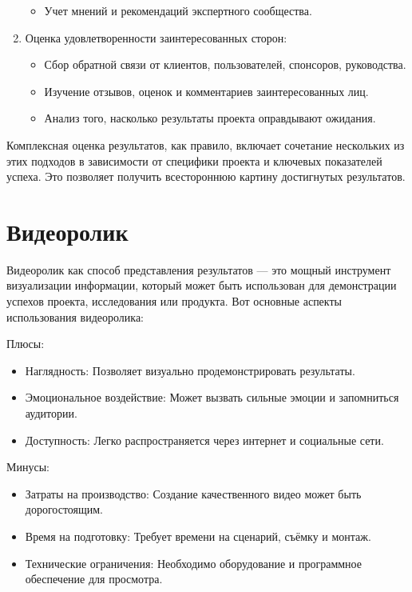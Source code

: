 \begin{enumerate}
\begin{itemize}
                \item Учет мнений и рекомендаций экспертного сообщества.
            \end{itemize}
        \item Оценка удовлетворенности заинтересованных сторон:
            \begin{itemize}
                \item Сбор обратной связи от клиентов, пользователей, спонсоров, руководства.
                \item Изучение отзывов, оценок и комментариев заинтересованных лиц.
                \item Анализ того, насколько результаты проекта оправдывают ожидания.
            \end{itemize}
    \end{enumerate}

    Комплексная оценка результатов, как правило, включает сочетание нескольких из этих подходов в зависимости от специфики проекта и ключевых показателей успеха. Это позволяет получить всестороннюю картину достигнутых результатов.

    \section{Видеоролик}
    Видеоролик как способ представления результатов — это мощный инструмент визуализации информации, который может быть использован для демонстрации успехов проекта, исследования или продукта. Вот основные аспекты использования видеоролика:
    
    Плюсы:
    \begin{itemize}
        \item Наглядность: Позволяет визуально продемонстрировать результаты.
        \item Эмоциональное воздействие: Может вызвать сильные эмоции и запомниться аудитории.
        \item Доступность: Легко распространяется через интернет и социальные сети.
    \end{itemize}
     
    Минусы:
    \begin{itemize}
        \item Затраты на производство: Создание качественного видео может быть дорогостоящим.
        \item Время на подготовку: Требует времени на сценарий, съёмку и монтаж.
        \item Технические ограничения: Необходимо оборудование и программное обеспечение для просмотра.
    \end{itemize}

